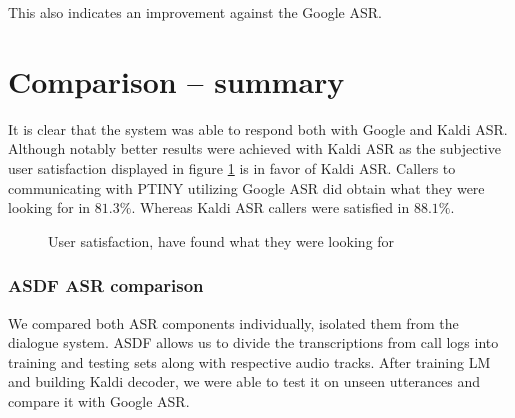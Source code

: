 \noindent This also indicates an improvement against the Google \ac{ASR}.

\section{Comparison -- summary}

It is clear that the system was able to respond both with Google and Kaldi \ac{ASR}.
Although notably better results were achieved with Kaldi \ac{ASR} as the subjective user satisfaction displayed in figure \ref{fig:us} is in favor of Kaldi \ac{ASR}.
Callers to communicating with \ac{PTINY} utilizing Google \ac{ASR} did obtain what they were looking for in $81.3\%$.
Whereas Kaldi \ac{ASR} callers were satisfied in $88.1\%$.

\begin{figure}[ht]
\caption{User satisfaction, have found what they were looking for}
\label{fig:us}
\end{figure}


\subsubsection{\ac{ASDF} \ac{ASR} comparison}

We compared both \ac{ASR} components individually, isolated them from the dialogue system.
\ac{ASDF} allows us to divide the transcriptions from call logs into training and testing sets along with respective audio tracks.
After training \ac{LM} and building Kaldi decoder, we were able to test it on unseen utterances and compare it with Google \ac{ASR}.

